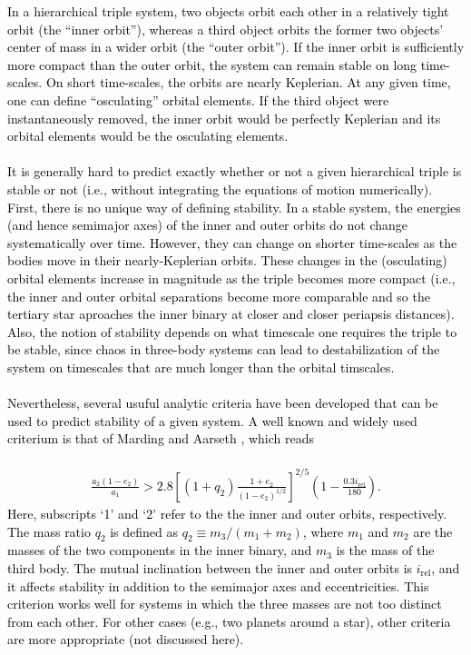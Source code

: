 \documentclass[main.tex]{subfiles}
\begin{document}
\begin{tcolorbox}[sharp corners, colback=blue!30, colframe=blue!80!blue,  title=Box \refstepcounter{educhap3}\label{boxchap3:stab}\ref{boxchap3:stab} -- Stability of hierarchical triples]
\par \textcolor{black}{ In a hierarchical triple system, two objects orbit each other in a relatively tight orbit (the ``inner orbit''), whereas a third object orbits the former two objects' center of mass in a wider orbit (the ``outer orbit''). If the inner orbit is sufficiently more compact than the outer orbit, the system can remain stable on long time-scales. On short time-scales, the orbits are nearly Keplerian. At any given time, one can define ``osculating'' orbital elements. If the third object were instantaneously removed, the inner orbit would be perfectly Keplerian and its orbital elements would be the osculating elements. \\ \\
It is generally hard to predict exactly whether or not a given hierarchical triple is stable or not (i.e., without integrating the equations of motion numerically). First, there is no unique way of defining stability. In a stable system, the energies (and hence semimajor axes) of the inner and outer orbits do not change systematically over time. However, they can change on shorter time-scales as the bodies move in their nearly-Keplerian orbits. These changes in the (osculating) orbital elements increase in magnitude as the triple becomes more compact (i.e., the inner and outer orbital separations become more comparable and so the tertiary star aproaches the inner binary at closer and closer periapsis distances).  Also, the notion of stability depends on what timescale one requires the triple to be stable, since chaos in three-body systems can lead to destabilization of the system on timescales that are much longer than the orbital timscales. \\ \\
Nevertheless, several usuful analytic criteria have been developed that can be used to predict stability of a given system. A well known and widely used criterium is that of Marding and Aarseth \citep{} , which reads \\ \\
\begin{align}
\frac{a_2(1-e_2)}{a_1} > 2.8 \left [ (1 + q_2) \frac{1+e_2}{(1 - e_2)^{1/2}} \right ]^{2/5} \left (1 - \frac{0.3 i_{\mathrm{rel}}}{180} \right ).
\end{align}
Here, subscripts `1' and `2' refer to the the inner and outer orbits, respectively. The mass ratio $q_2$ is defined as $q_2 \equiv m_3/(m_1+m_2)$, where $m_1$ and $m_2$ are the masses of the two components in the inner binary, and $m_3$ is the mass of the third body. The mutual inclination between the inner and outer orbits is $i_{\mathrm{rel}}$, and it affects stability in addition to the semimajor axes and eccentricities. This criterion works well for systems in which the three masses are not too distinct from each other. For other cases (e.g., two planets around a star), other criteria are more appropriate (not discussed here). 
}
\end{tcolorbox}
\end{document}
